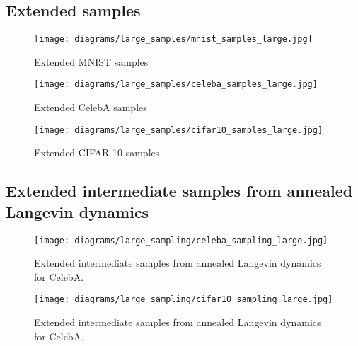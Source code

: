 \documentclass{article}
\begin{document}
\subsection{Extended samples}
\vspace*{\fill}
\FloatBarrier
\begin{figure}[H]
    \centering
    \texttt{[image: diagrams/large\_samples/mnist\_samples\_large.jpg]}
    \caption{Extended MNIST samples}
    \label{fig:mnist_large}
\end{figure}
\FloatBarrier
\vfill
\newpage
\vspace*{\fill}
\FloatBarrier
\begin{figure}[H]
    \centering
    \texttt{[image: diagrams/large\_samples/celeba\_samples\_large.jpg]}
    \caption{Extended CelebA samples}
    \label{fig:celeba_large}
\end{figure}
\FloatBarrier
\vfill
\newpage
\vspace*{\fill}
\FloatBarrier
\begin{figure}[H]
    \centering
    \texttt{[image: diagrams/large\_samples/cifar10\_samples\_large.jpg]}
    \caption{Extended CIFAR-10 samples}
    \label{fig:cifar10_large}
\end{figure}
\FloatBarrier
\vfill
\newpage
\subsection{Extended intermediate samples from annealed Langevin dynamics}
\vspace*{\fill}
\FloatBarrier
\begin{figure}[H]
    \centering
    \texttt{[image: diagrams/large\_sampling/celeba\_sampling\_large.jpg]}
    \caption{Extended intermediate samples from annealed Langevin dynamics for CelebA.}
\end{figure}
\begin{figure}[H]
    \centering
    \texttt{[image: diagrams/large\_sampling/cifar10\_sampling\_large.jpg]}
    \caption{Extended intermediate samples from annealed Langevin dynamics for CelebA.}
\end{figure}
\FloatBarrier
\vfill
\newpage
\end{document}

